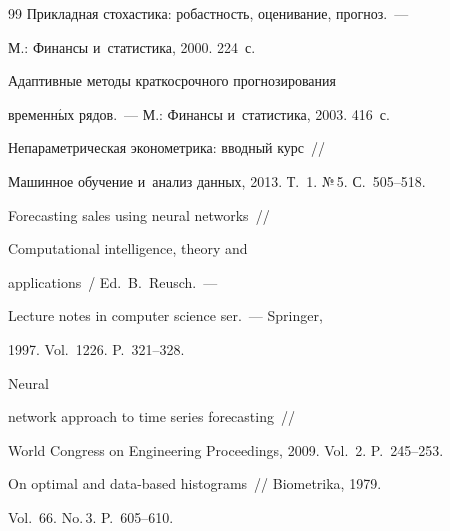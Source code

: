 {{\begin{thebibliography}{99}
 Прикладная стохастика: робастность, оценивание, прогноз.~---


М.: Финансы и~статистика, 2000. 224~с.







 Адаптивные методы краткосрочного прогнозирования


временн$\acute{\mbox{ы}}$х рядов.~--- М.: Финансы и~статистика, 2003. 416~с.







  Непараметрическая эконометрика: вводный курс~/\!\!/


Машинное обучение и~анализ данных, 2013. Т.~1. №\,5. С.~505--518.







 Forecasting sales using neural networks~/\!\!/


Computational intelligence, theory and


applications~/ Ed.\ B.~Reusch.~---


Lecture notes in computer science ser.~--- Springer,


1997. Vol.~1226. P.~321--328.







 Neural


network approach to time series forecasting~/\!\!/


World Congress on Engineering Proceedings, 2009. Vol.~2. P.~245--253.













 On optimal and data-based histograms~/\!\!/ Biometrika, 1979.


Vol.~66. No.\,3. P.~605--610.








\end{thebibliography}}}
